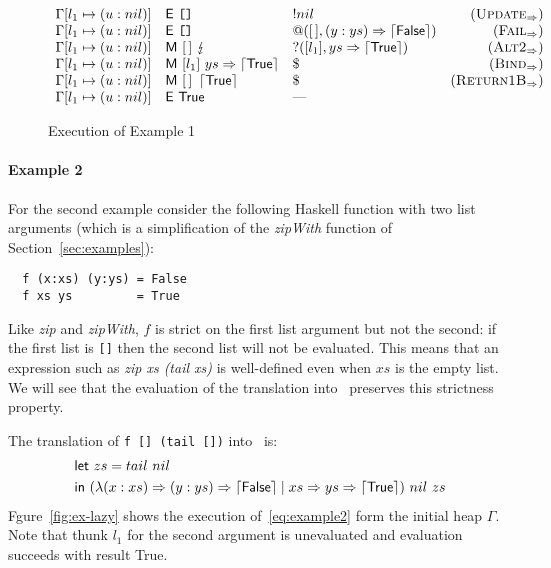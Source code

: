 \begin{figure*}
\[\begin{array}{lllr}
    \Gamma[l_1\mapsto(u : nil)]             & \textsf{E}~\texttt{[]}                                                & !nil                                       & (\textsc{Update}_{\Rightarrow})   \\
    \Gamma[l_1\mapsto(u : nil)]             & \textsf{E}~\texttt{[]}                                                & @([\,],(y : ys) \Rightarrow \left\lceil \textsf{False}\right\rceil)     & (\textsc{Fail}_{\Rightarrow})     \\
    \Gamma[l_1\mapsto(u : nil)]             & \textsf{M}~[\,]~\lightning                                   & ?([l_1],ys \Rightarrow \left\lceil \textsf{True}\right\rceil)           & (\textsc{Alt2}_{\Rightarrow})     \\
    \Gamma[l_1\mapsto(u : nil)]             & \textsf{M}~[l_1]~ys \Rightarrow \left\lceil \textsf{True}\right\rceil                     & \$                                         & (\textsc{Bind}_{\Rightarrow})     \\
    \Gamma[l_1\mapsto(u : nil)]             & \textsf{M}~[\,]~\left\lceil \textsf{True}\right\rceil                                     & \$                                         & (\textsc{Return1B}_{\Rightarrow})  \\
    \Gamma[l_1\mapsto(u : nil)]             & \textsf{E}~\textsf{True}                                               & \text{---}                                 &                        \\
  \end{array}
\]
\caption{Execution of Example 1}
\label{fig:ex-short}
\end{figure*}

\paragraph{Example 2}
For the second example consider the following Haskell function with
two list arguments (which is a simplification of the \textit{zipWith}
function of Section~\ref{sec:examples}):
\begin{verbatim}
  f (x:xs) (y:ys) = False
  f xs ys         = True
\end{verbatim}
%
Like \textit{zip} and \textit{zipWith}, $f$ is strict on the first list argument
but not the second: if the first list is \texttt{[]} then the second
list will not be evaluated.
This means that an expression such as \textit{zip xs (tail xs)} is
well-defined even when $xs$ is the empty list.
We will see that the evaluation of the
translation into \lambdaPMC\ preserves this strictness property.

The translation of \verb|f [] (tail [])| into \lambdaPMC\ is:
\begin{equation}
  \begin{split}
  &\textsf{let}~ zs = tail~nil \\
  &\textsf{in}~ (\lambda(x : xs) \Rightarrow (y : ys) \Rightarrow \left\lceil \textsf{False}\right\rceil \mid xs \Rightarrow ys \Rightarrow \left\lceil \textsf{True}\right\rceil)~nil~zs
  \end{split} \label{eq:example2}
\end{equation}
Fgure~\ref{fig:ex-lazy} shows the execution of~\eqref{eq:example2}
form the initial heap $\Gamma$.  Note that thunk $l_1$ for the second
argument is unevaluated and evaluation succeeds with result
\textsf{True}.

